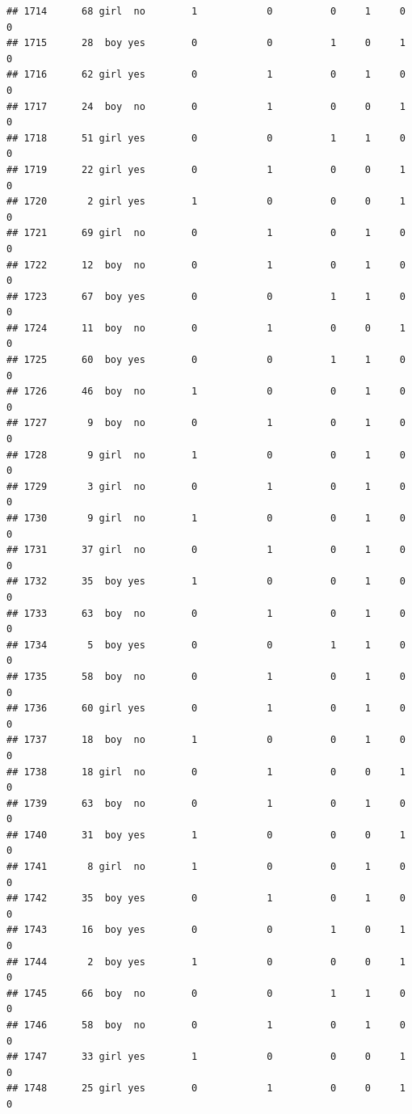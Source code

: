 \documentclass[man]{apa6}
\begin{document}
\begin{verbatim}
## 1714      68 girl  no        1            0          0     1     0     0
## 1715      28  boy yes        0            0          1     0     1     0
## 1716      62 girl yes        0            1          0     1     0     0
## 1717      24  boy  no        0            1          0     0     1     0
## 1718      51 girl yes        0            0          1     1     0     0
## 1719      22 girl yes        0            1          0     0     1     0
## 1720       2 girl yes        1            0          0     0     1     0
## 1721      69 girl  no        0            1          0     1     0     0
## 1722      12  boy  no        0            1          0     1     0     0
## 1723      67  boy yes        0            0          1     1     0     0
## 1724      11  boy  no        0            1          0     0     1     0
## 1725      60  boy yes        0            0          1     1     0     0
## 1726      46  boy  no        1            0          0     1     0     0
## 1727       9  boy  no        0            1          0     1     0     0
## 1728       9 girl  no        1            0          0     1     0     0
## 1729       3 girl  no        0            1          0     1     0     0
## 1730       9 girl  no        1            0          0     1     0     0
## 1731      37 girl  no        0            1          0     1     0     0
## 1732      35  boy yes        1            0          0     1     0     0
## 1733      63  boy  no        0            1          0     1     0     0
## 1734       5  boy yes        0            0          1     1     0     0
## 1735      58  boy  no        0            1          0     1     0     0
## 1736      60 girl yes        0            1          0     1     0     0
## 1737      18  boy  no        1            0          0     1     0     0
## 1738      18 girl  no        0            1          0     0     1     0
## 1739      63  boy  no        0            1          0     1     0     0
## 1740      31  boy yes        1            0          0     0     1     0
## 1741       8 girl  no        1            0          0     1     0     0
## 1742      35  boy yes        0            1          0     1     0     0
## 1743      16  boy yes        0            0          1     0     1     0
## 1744       2  boy yes        1            0          0     0     1     0
## 1745      66  boy  no        0            0          1     1     0     0
## 1746      58  boy  no        0            1          0     1     0     0
## 1747      33 girl yes        1            0          0     0     1     0
## 1748      25 girl yes        0            1          0     0     1     0

\end{verbatim}
\end{document}
